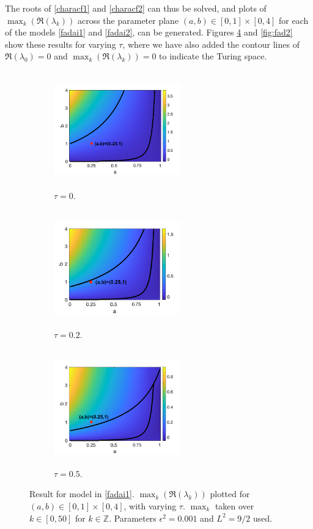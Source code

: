The roots of \eqref{characf1} and \eqref{characf2} can thus be solved, and plots of $\max_k(\Re(\lambda_k))$ across the parameter plane $(a,b)\in[0,1]\times[0,4]$ for each of the models \eqref{fadai1} and \eqref{fadai2}, can be generated. Figures \ref{fig:fad1} and \ref{fig:fad2} show these results for varying $\tau$, where we have also added the contour lines of $\Re(\lambda_0)=0$ and $\max_k(\Re(\lambda_k))=0$ to indicate the Turing space.
\begin{figure}[H]
    \centering
    \begin{subfigure}[t]{0.32\textwidth}
        \centering
        \includegraphics[width=5.5cm,height = 5cm]{f1t0.png}
        \caption{$\tau=0$.}
        \label{}
    \end{subfigure}
    \hfill
    \begin{subfigure}[t]{0.32\textwidth}
        \centering
        \includegraphics[width=5.5cm,height = 5cm]{f1t02.png}
        \caption{$\tau=0.2$.}
        \label{}
    \end{subfigure}
    \hfill
    \begin{subfigure}[t]{0.32\textwidth}
        \centering
        \includegraphics[width=5.5cm,height = 5cm]{f1t05.png}
        \caption{$\tau=0.5$.}
        \label{f}
    \end{subfigure}
    \caption{Result for model in \eqref{fadai1}. $\max_k(\Re(\lambda_k))$ plotted for $(a,b)\in[0,1]\times[0,4]$, with varying $\tau$. $\max_k$ taken over $k\in[0,50]$ for $k\in\mathbb{Z}$. Parameters $\epsilon^2=0.001$ and $L^2=9/2$ used.}
    \label{fig:fad1}
\end{figure}
